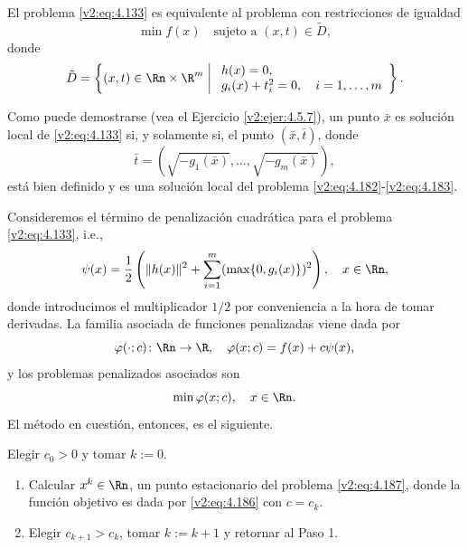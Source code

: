 El problema \eqref{v2:eq:4.133} es equivalente al problema con restricciones de igualdad
\begin{equation}
    \min f(x) \quad \text{sujeto a } (x, t) \in \tilde{D},
    \label{v2:eq:4.182}
\end{equation}
donde
\begin{equation}
    \tilde{D} = \left\{ (x, t) \in \Rn \times \R^m \mathrel{\bigg|} \begin{array}{l} h(x) = 0, \\ g_i(x) + t_i^2 = 0, \quad i = 1, \dots, m \end{array} \right\}.
    \label{v2:eq:4.183}
\end{equation}

Como puede demostrarse (vea el Ejercicio \ref{v2:ejer:4.5.7}), un punto $\bar{x}$ es solución local de \eqref{v2:eq:4.133} si, y solamente si, el punto $(\bar{x}, \bar{t})$, donde
\begin{equation}
    \bar{t} = (\sqrt{-g_1(\bar{x})}, \dots, \sqrt{-g_m(\bar{x})}),
    \label{v2:eq:4.184}
\end{equation}
está bien definido y es una solución local del problema \eqref{v2:eq:4.182}-\eqref{v2:eq:4.183}. 

Consideremos el término de penalización cuadrática para el problema \eqref{v2:eq:4.133}, i.e.,
\begin{equation}
    \psi(x) = \frac{1}{2} \left( \|h(x)\|^2 + \sum_{i=1}^m (\max\{0, g_i(x)\})^2 \right), \quad x \in \Rn,
    \label{v2:eq:4.185}
\end{equation}
donde introducimos el multiplicador $1/2$ por conveniencia a la hora de tomar derivadas. La familia asociada de funciones penalizadas viene dada por
\begin{equation}
    \varphi(\cdot; c) \colon \Rn \to \R, \quad \varphi(x; c) = f(x) + c\psi(x),
    \label{v2:eq:4.186}
\end{equation}
y los problemas penalizados asociados son
\begin{equation}
    \min \varphi(x; c), \quad x \in \Rn.
    \label{v2:eq:4.187}
\end{equation}
El método en cuestión, entonces, es el siguiente.

\begin{algorithm}\label{v2:alg:4.5.3}
Elegir $c_0 > 0$ y tomar $k := 0$.
\begin{enumerate}
    \item Calcular $x^k \in \Rn$, un punto estacionario del problema \eqref{v2:eq:4.187}, donde la función objetivo es dada por \eqref{v2:eq:4.186} con $c = c_k$.
    \item Elegir $c_{k+1} > c_k$, tomar $k := k + 1$ y retornar al Paso 1.
\end{enumerate}
\end{algorithm}

